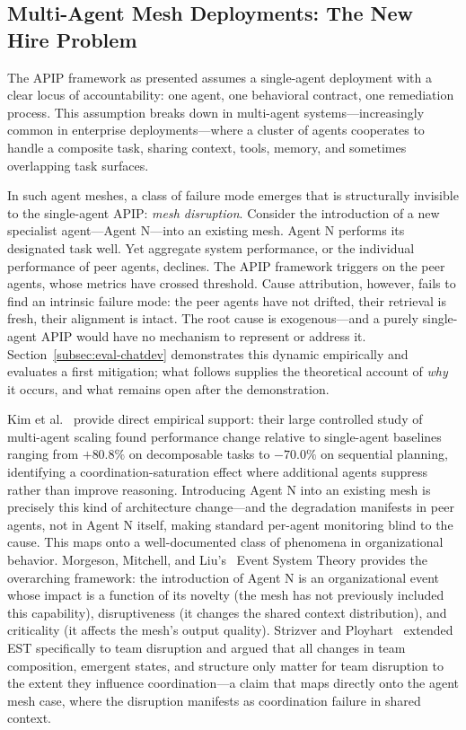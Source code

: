 \documentclass[conference]{IEEEtran}
\begin{document}
\subsection{Multi-Agent Mesh Deployments: The New Hire Problem}
\label{subsec:mesh}

The APIP framework as presented assumes a single-agent deployment with a clear
locus of accountability: one agent, one behavioral contract, one remediation
process. This assumption breaks down in multi-agent systems---increasingly
common in enterprise deployments---where a cluster of agents cooperates to
handle a composite task, sharing context, tools, memory, and sometimes
overlapping task surfaces.

In such agent meshes, a class of failure mode emerges that is structurally
invisible to the single-agent APIP: \emph{mesh disruption}. Consider the
introduction of a new specialist agent---Agent N---into an existing mesh. Agent
N performs its designated task well. Yet aggregate system performance, or the
individual performance of peer agents, declines. The APIP framework triggers on
the peer agents, whose metrics have crossed threshold. Cause attribution,
however, fails to find an intrinsic failure mode: the peer agents have not
drifted, their retrieval is fresh, their alignment is intact. The root cause is
exogenous---and a purely single-agent APIP would have no mechanism to represent
or address it. Section~\ref{subsec:eval-chatdev} demonstrates this dynamic
empirically and evaluates a first mitigation; what follows supplies the
theoretical account of \emph{why} it occurs, and what remains open after the
demonstration.

Kim et al.~\cite{kim2025scaling} provide direct empirical support: their large
controlled study of multi-agent scaling found performance change relative to
single-agent baselines ranging from $+80.8\%$ on decomposable tasks to
$-70.0\%$ on sequential planning, identifying a coordination-saturation effect
where additional agents suppress rather than improve reasoning. Introducing
Agent N into an existing mesh is precisely this kind of architecture
change---and the degradation manifests in peer agents, not in Agent N itself,
making standard per-agent monitoring blind to the cause. This maps onto a
well-documented class of phenomena in organizational behavior. Morgeson,
Mitchell, and Liu's~\cite{morgeson2015event} Event System Theory provides the
overarching framework: the introduction of Agent N is an organizational event
whose impact is a function of its novelty (the mesh has not previously included
this capability), disruptiveness (it changes the shared context distribution),
and criticality (it affects the mesh's output quality). Strizver and
Ployhart~\cite{strizver2024disruption} extended EST specifically to team
disruption and argued that all changes in team composition, emergent states,
and structure only matter for team disruption to the extent they influence
coordination---a claim that maps directly onto the agent mesh case, where the
disruption manifests as coordination failure in shared context.
\end{document}

